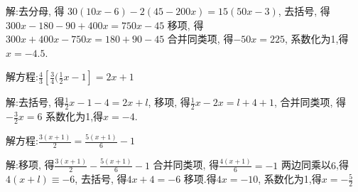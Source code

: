 \documentclass[cn,blue,12pt]{elegantbook}
\begin{document}
\begin{liti}[resume]
\begin{solution}
        解:去分母, 得 \(30(10x-6)-2(45-200x) = 15(50x - 3)\),
        去括号, 得 \(300x-180-90+400x=750x-45\)
        移项, 得 \(300x+400x-750x= 180+90-45\)
        合并同类项, 得\(-50x=225\),
        系数化为1,得\(x=-4.5\).
\end{solution}
\item 解方程:\(\frac{4}{3}[\frac{3}{4}(\frac{1}{2}x-1]=2x+1\)
\begin{solution}
        解:去括号, 得\(\frac{1}{2}x-1-4=2x+l\),
        移项, 得\(\frac{1}{2}x-2x=l+4+1\),
        合并同类项, 得\(-\frac{3}{2}x=6\)
        系数化为1,得\(x=-4\).
\end{solution}
\item 解方程:\(\frac{3(x+1)}{2}=\frac{5(x+1)}{6}-1\)
\begin{solution}
        解:移项, 得\(\frac{3(x+1)}{2}-\frac{5(x+1)}{6}-1\)
        合并同类项, 得\(\frac{4(x+1)}{6}=-1\)
        两边同乘以\(6\),得\(4(x+l)≡-6\),
        去括号, 得\(4x+4=-6\)
        移项.得\(4x=-10\),
        系数化为1,得\(x=-\frac{5}{2}\)
\end{solution}
\end{liti}
\end{document}
